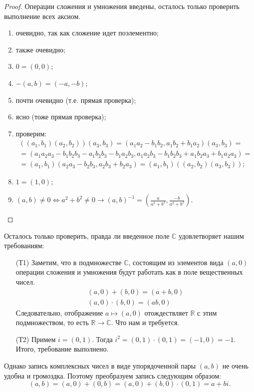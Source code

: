 \begin{proof}
Операции сложения и умножения введены, осталось только проверить выполнение всех аксиом.
\begin{enumerate}
\item очевидно, так как сложение идет поэлементно;
\item также очевидно;
\item $0 = (0, 0)$;
\item $-(a, b) = (-a, -b)$;
\item почти очевидно (т.е. прямая проверка);
\item ясно (тоже прямая проверка);
\item проверим:
\begin{gather*}
((a_1, b_1) (a_2, b_2)) (a_3, b_3) = (a_1a_2 - b_1b_2, a_1b_2 + b_1a_2) (a_3, b_3) = \\ 
= (a_1a_2a_3 - b_1b_2b_3 - a_1b_2b_3 - b_1a_2b_3, a_1a_2b_3 - b_1b_2b_3 + a_1b_2a_3 + b_1a_2a_3) = \\
= (a_1, b_1)  (a_2a_3 - b_2b_3, a_2b_3 + b_2a_3) = (a_1, b_1)((a_2, b_2) (a_3, b_3));
\end{gather*}
\item $1 = (1, 0)$;
\item $(a, b) \neq 0 \Leftrightarrow a^2 + b^2 \neq 0 \rightarrow (a, b)^{-1} = \left(\frac{a}{a^2 + b^2}, \frac{-b}{a^2 + b^2}\right)$.
\end{enumerate}
\end{proof}

Осталось только проверить, правда ли введенное поле $\mathbb{C}$ удовлетворяет нашим требованиям:
\begin{itemize}
\item[(Т1)] Заметим, что в подмножестве $\mathbb{C}$, состоящим из элементов вида $(a, 0)$ операции сложения и умножения будут работать как в поле вещественных чисел.
\begin{gather*}
(a, 0) + (b, 0) = (a + b, 0) \\
(a, 0) \cdot (b, 0) = (ab, 0)
\end{gather*} 
Следовательно, отображение $a \mapsto (a, 0)$ отождествляет $\mathbb{R}$ с этим подмножеством, то есть $\mathbb{R} \rightarrow \mathbb{C}$. Что нам и требуется.
\item[(Т2)] Примем $i = (0, 1)$. Тогда $i^2 = (0, 1) \cdot (0, 1) = (-1, 0) = -1$. Итого, требование выполнено.
\end{itemize}

Однако запись комплексных чисел в виде упорядоченной пары $(a, b)$ не очень удобна и громоздка. Поэтому преобразуем запись следующим образом:
\[
(a, b) = (a, 0) + (0, b) = (a, 0) + (b, 0) \cdot (0, 1) = a + bi.
\]

